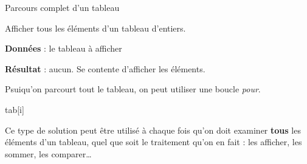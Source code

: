 \begin{Fiche}{Parcours complet d'un tableau}
\label{fiche:tab-parcours-complet}

	Afficher tous les éléments d'un tableau d'entiers.

	
	\textbf{Données} : le tableau à afficher
		
	\textbf{Résultat} : aucun. Se contente d'afficher les éléments.


	Psuiqu'on parcourt tout le tableau,
	on peut utiliser une boucle \emph{pour}.
	
	\begin{LDA}
				\Write tab[i]
			\EndFor
		\EndAlgo
	\end{LDA}


	Ce type de solution peut être utilisé à chaque fois
	qu'on doit examiner \textbf{tous} les éléments d'un tableau,
	quel que soit le traitement qu'on en fait :
	les afficher, les sommer, les comparer\dots
	
	
\end{Fiche}

